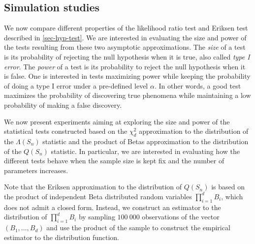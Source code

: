 \subsection{Simulation studies}

We now compare different properties of the likelihood ratio test and Eriksen test described in \ref{sec-hyp-test}. We are interested in evaluating the size and power of the tests resulting from these two asymptotic approximations. The \textit{size} of a test is its probability of rejecting the null hypothesis when it is true, also called \textit{type I error}. The \textit{power} of a test is its probability to reject the null hypothesis when it is false. One is interested in tests maximizing power while keeping the probability of doing a type I error under a pre-defined level $\alpha$. In other words, a good test maximizes the probability of discovering true phenomena while maintaining a low probability of making a false discovery. 

We now present experiments aiming at exploring the size and power of the statistical tests constructed based on the $\chi^2_d$ approximation to the distribution of the $\Lambda(S_n)$ statistic and the product of Betas approximation to the distribution of the $Q(S_n)$ statistic. In particular, we are interested in evaluating how the different tests behave when the sample size is kept fix and the number of parameters increases.

Note that the Eriksen approximation to the distribution of $Q(S_n)$ is based on the product of independent Beta distributed random variables $\prod_{i=1}^d B_i$, which does not admit a closed form. Instead, we construct an estimator to the distribution of $\prod_{i=1}^d B_i$ by sampling $100\ 000$ observations of the vector $(B_1, \ldots, B_d)$ and use the product of the sample to construct the empirical estimator to the distribution function.

